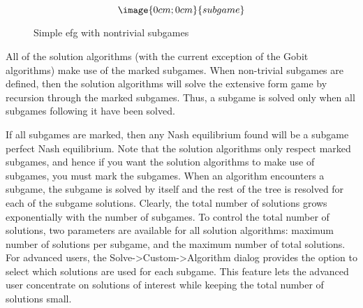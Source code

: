 \begin{figure}
$$\image{0cm;0cm}{subgame}$$
\caption{Simple efg with nontrivial subgames}\label{fig_subgames}
\end{figure}

All of the solution algorithms (with the current exception of the 
Gobit algorithms) make use of the marked subgames.  When non-trivial 
subgames are defined, then the solution algorithms will solve the 
extensive form game by recursion through the marked subgames.  Thus, a 
subgame is solved only when all subgames following it have been 
solved.  

If all subgames are marked, then any Nash equilibrium found will be a 
subgame perfect Nash equilibrium.  
Note that the solution algorithms only 
respect marked subgames, and hence if you want the solution 
algorithms to make use of subgames, you must mark the subgames.  
When an algorithm encounters a subgame, the subgame is solved by itself and
the rest of the tree is resolved for each of the subgame solutions.  Clearly,
the total number of solutions grows exponentially with the number of subgames.
To control the total number of solutions, two parameters are available for
all solution algorithms: maximum number of solutions per subgame, and the
maximum number of total solutions. For advanced
users, the Solve->Custom->Algorithm dialog provides the option to select
which solutions are used for each subgame.  This feature lets the advanced user
concentrate on solutions of interest while keeping the total number of solutions
small.

